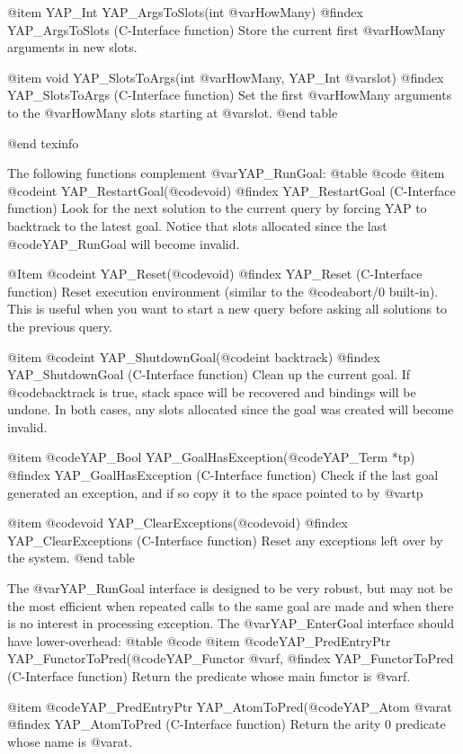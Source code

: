 @item YAP_Int YAP_ArgsToSlots(int @var{HowMany})
@findex YAP_ArgsToSlots (C-Interface function)
Store the current first  @var{HowMany} arguments in new slots.

@item void YAP_SlotsToArgs(int @var{HowMany}, YAP_Int @var{slot})
@findex YAP_SlotsToArgs (C-Interface function)
Set the first @var{HowMany} arguments to the @var{HowMany} slots
starting at @var{slot}.
@end table

@end texinfo

The following functions complement @var{YAP_RunGoal}:
@table @code
@item  @code{int} YAP_RestartGoal(@code{void})
@findex YAP_RestartGoal (C-Interface function)
Look for the next solution to the current query by forcing YAP to
backtrack to the latest goal. Notice that slots allocated since the last
@code{YAP_RunGoal} will become invalid.

@Item  @code{int} YAP_Reset(@code{void})
@findex YAP_Reset (C-Interface function)
Reset execution environment (similar to the @code{abort/0}
built-in). This is useful when you want to start a new query before
asking all solutions to the previous query.

@item  @code{int} YAP_ShutdownGoal(@code{int backtrack})
@findex YAP_ShutdownGoal (C-Interface function)
Clean up the current goal. If
@code{backtrack} is true, stack space will be recovered and bindings
will be undone. In both cases, any slots allocated since the goal was
created will become invalid.

@item  @code{YAP_Bool} YAP_GoalHasException(@code{YAP_Term *tp})
@findex YAP_GoalHasException (C-Interface function)
Check if the last goal generated an exception, and if so copy it to the
space pointed to by @var{tp}

@item  @code{void} YAP_ClearExceptions(@code{void})
@findex YAP_ClearExceptions (C-Interface function)
Reset any exceptions left over by the system.
@end table

The @var{YAP_RunGoal} interface is designed to be very robust, but may
not be the most efficient when repeated calls to the same goal are made
and when there is no interest in processing exception. The
@var{YAP_EnterGoal} interface should have lower-overhead:
@table @code
@item  @code{YAP_PredEntryPtr} YAP_FunctorToPred(@code{YAP_Functor} @var{f},
@findex YAP_FunctorToPred (C-Interface function)
Return the predicate whose main functor is @var{f}.

@item  @code{YAP_PredEntryPtr} YAP_AtomToPred(@code{YAP_Atom} @var{at}
@findex YAP_AtomToPred (C-Interface function)
Return the arity 0 predicate whose name is @var{at}.

